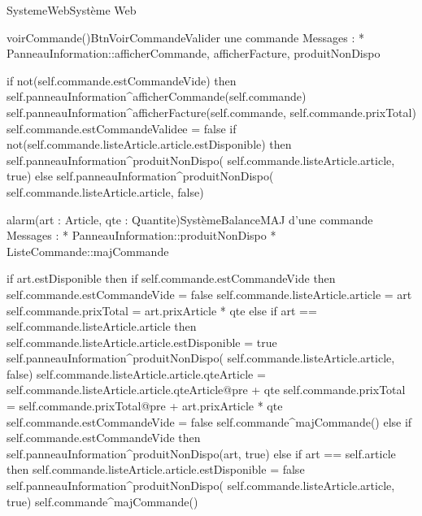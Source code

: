 \begin{OM}{SystemeWeb}{Système Web}

\begin{OMOperation}{voirCommande()}{BtnVoirCommande}{Valider une commande}
Messages :
* PanneauInformation::{afficherCommande, afficherFacture, produitNonDispo}
\begin{OMPre}
\end{OMPre}
\begin{OMPost}
        if not(self.commande.estCommandeVide) then
                self.panneauInformation^afficherCommande(self.commande)
                self.panneauInformation^afficherFacture(self.commande, self.commande.prixTotal)
                self.commande.estCommandeValidee = false
                if not(self.commande.listeArticle.article.estDisponible) then
                        self.panneauInformation^produitNonDispo( self.commande.listeArticle.article, true)
                else
                        self.panneauInformation^produitNonDispo( self.commande.listeArticle.article, false)
                    \end{OMPost}
\end{OMOperation}

\begin{OMOperation}{alarm(art : Article, qte : Quantite)}{SystèmeBalance}{MAJ d'une commande}
Messages :
* PanneauInformation::{produitNonDispo}
* ListeCommande::{majCommande}
\begin{OMPre}
\end{OMPre}
\begin{OMPost}
        if art.estDisponible then
                if self.commande.estCommandeVide then
                        self.commande.estCommandeVide = false
self.commande.listeArticle.article = art
self.commande.prixTotal = art.prixArticle * qte
                else
                        if art == self.commande.listeArticle.article then
                                self.commande.listeArticle.article.estDisponible = true
                                self.panneauInformation^produitNonDispo(
self.commande.listeArticle.article, false)
                                self.commande.listeArticle.article.qteArticle =
self.commande.listeArticle.article.qteArticle@pre + qte
self.commande.prixTotal = self.commande.prixTotal@pre +
art.prixArticle * qte
                        self.commande.estCommandeVide = false
                self.commande^majCommande()
        else
                if self.commande.estCommandeVide then
                        self.panneauInformation^produitNonDispo(art, true)
                else
if art == self.article then
        self.commande.listeArticle.article.estDisponible = false
                                self.panneauInformation^produitNonDispo(
self.commande.listeArticle.article, true)
                self.commande^majCommande()
            \end{OMPost}
\end{OMOperation}


\end{OM}
